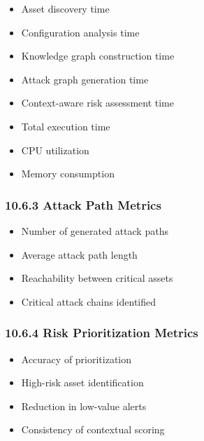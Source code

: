 \begin{itemize}
\tightlist
\item
  Asset discovery time\\
\item
  Configuration analysis time\\
\item
  Knowledge graph construction time\\
\item
  Attack graph generation time\\
\item
  Context-aware risk assessment time\\
\item
  Total execution time\\
\item
  CPU utilization\\
\item
  Memory consumption
\end{itemize}

\subsubsection{10.6.3 Attack Path Metrics}

\begin{itemize}
\tightlist
\item
  Number of generated attack paths\\
\item
  Average attack path length\\
\item
  Reachability between critical assets\\
\item
  Critical attack chains identified
\end{itemize}

\subsubsection{10.6.4 Risk Prioritization Metrics}

\begin{itemize}
\tightlist
\item
  Accuracy of prioritization\\
\item
  High-risk asset identification\\
\item
  Reduction in low-value alerts\\
\item
  Consistency of contextual scoring
\end{itemize}

